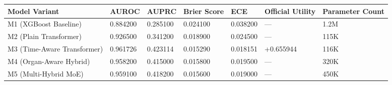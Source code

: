 \begin{tabular}{lllllll}
\toprule
Model Variant & AUROC & AUPRC & Brier Score & ECE & Official Utility & Parameter Count \\
\midrule
M1 (XGBoost Baseline) & 0.884200 & 0.285100 & 0.024100 & 0.038200 & — & 1.2M \\
M2 (Plain Transformer) & 0.926500 & 0.341200 & 0.018900 & 0.024500 & — & 115K \\
M3 (Time-Aware Transformer) & 0.961726 & 0.423114 & 0.015290 & 0.018151 & +0.655944 & 116K \\
M4 (Organ-Aware Hybrid) & 0.958200 & 0.415000 & 0.015800 & 0.019500 & — & 320K \\
M5 (Multi-Hybrid MoE) & 0.959100 & 0.418200 & 0.015600 & 0.019000 & — & 450K \\
\bottomrule
\end{tabular}

